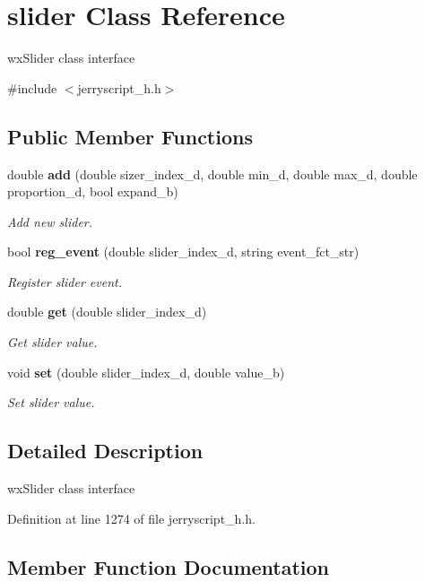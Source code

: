 \section{slider Class Reference}
\label{classslider}


wx\+Slider class interface  




{\ttfamily \#include $<$jerryscript\+\_\+h.\+h$>$}

\subsection*{Public Member Functions}
\begin{DoxyCompactItemize}
\item 
double \textbf{ add} (double sizer\+\_\+index\+\_\+d, double min\+\_\+d, double max\+\_\+d, double proportion\+\_\+d, bool expand\+\_\+b)
\begin{DoxyCompactList}\small\item\em Add new slider. \end{DoxyCompactList}\item 
bool \textbf{ reg\+\_\+event} (double slider\+\_\+index\+\_\+d, string event\+\_\+fct\+\_\+str)
\begin{DoxyCompactList}\small\item\em Register slider event. \end{DoxyCompactList}\item 
double \textbf{ get} (double slider\+\_\+index\+\_\+d)
\begin{DoxyCompactList}\small\item\em Get slider value. \end{DoxyCompactList}\item 
void \textbf{ set} (double slider\+\_\+index\+\_\+d, double value\+\_\+b)
\begin{DoxyCompactList}\small\item\em Set slider value. \end{DoxyCompactList}\end{DoxyCompactItemize}


\subsection{Detailed Description}
wx\+Slider class interface 

Definition at line 1274 of file jerryscript\+\_\+h.\+h.



\subsection{Member Function Documentation}
\mbox{\label{classslider_aebc02dc8ce3998d9dc68eadfb58e86e8}} 
